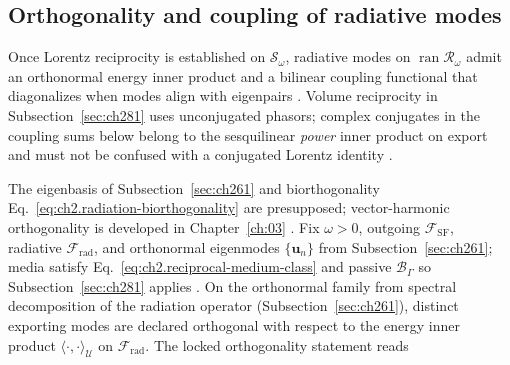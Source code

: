 \subsection{Orthogonality and coupling of radiative modes}
\label{sec:ch282}

Once Lorentz reciprocity is established on $\mathcal{S}_\omega$, radiative modes on
$\operatorname{ran}\mathcal{R}_\omega$ admit an orthonormal energy inner product and a bilinear
coupling functional that diagonalizes when modes align with eigenpairs
\cite{stratton1941,harrington2001}. Volume reciprocity in Subsection~\ref{sec:ch281} uses
unconjugated phasors; complex conjugates in the coupling sums below belong to the sesquilinear
\emph{power} inner product on export and must not be confused with a conjugated Lorentz identity
\cite{stratton1941}.

The eigenbasis of Subsection~\ref{sec:ch261} and biorthogonality
Eq.~\eqref{eq:ch2.radiation-biorthogonality} are presupposed; vector-harmonic orthogonality is
developed in Chapter~\ref{ch:03} \cite{stratton1941}. Fix $\omega>0$, outgoing
$\mathcal{F}_{\mathrm{SF}}$, radiative $\mathcal{F}_{\mathrm{rad}}$, and orthonormal eigenmodes
$\{\mathbf{u}_n\}$ from Subsection~\ref{sec:ch261}; media satisfy Eq.~\eqref{eq:ch2.reciprocal-medium-class}
and passive $\mathcal{B}_\Gamma$ so Subsection~\ref{sec:ch281} applies \cite{stratton1941}.
On the orthonormal family from spectral decomposition of the radiation operator
(Subsection~\ref{sec:ch261}), distinct exporting modes are declared orthogonal with respect to the
energy inner product $\langle\cdot,\cdot\rangle_{\mathcal{U}}$ on $\mathcal{F}_{\mathrm{rad}}$.
The locked orthogonality statement reads


